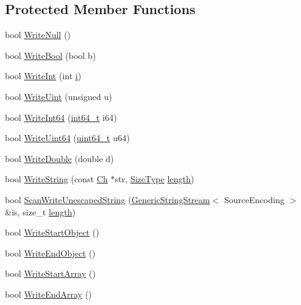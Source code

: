 \subsection*{Protected Member Functions}
\begin{DoxyCompactItemize}
\item 
bool \hyperlink{classWriter_a44862b3eba8d84b909c69aba875c9f4d}{Write\+Null} ()
\item 
bool \hyperlink{classWriter_a42ad68b6950431bb8ca0199568546eaf}{Write\+Bool} (bool b)
\item 
bool \hyperlink{classWriter_a31d0feda654ca245c41462be7dc59998}{Write\+Int} (int \hyperlink{game__play__state_8cpp_acb559820d9ca11295b4500f179ef6392}{i})
\item 
bool \hyperlink{classWriter_a2861227e93707d1478d2cf56644dca3b}{Write\+Uint} (unsigned u)
\item 
bool \hyperlink{classWriter_aa58d3f80c06394648de5055ecfb41587}{Write\+Int64} (\hyperlink{stdint_8h_a414156feea104f8f75b4ed9e3121b2f6}{int64\+\_\+t} i64)
\item 
bool \hyperlink{classWriter_ad07b325157220e3aa791c1c8c904021e}{Write\+Uint64} (\hyperlink{stdint_8h_aec6fcb673ff035718c238c8c9d544c47}{uint64\+\_\+t} u64)
\item 
bool \hyperlink{classWriter_ae7a0fc4740681d845d92c1213bd25aa1}{Write\+Double} (double d)
\item 
bool \hyperlink{classWriter_acda4412ef5f4cac6e89f9544e4b10f70}{Write\+String} (const \hyperlink{classWriter_ab08bff5fd2daec65f4a78779ca3d2139}{Ch} $\ast$str, \hyperlink{rapidjson_8h_a5ed6e6e67250fadbd041127e6386dcb5}{Size\+Type} \hyperlink{imgui__impl__opengl3__loader_8h_a011fc24f10426c01349e94a4edd4b0d5}{length})
\item 
bool \hyperlink{classWriter_a94140803bba7863a1b39c936bbe6d262}{Scan\+Write\+Unescaped\+String} (\hyperlink{structGenericStringStream}{Generic\+String\+Stream}$<$ Source\+Encoding $>$ \&is, size\+\_\+t \hyperlink{imgui__impl__opengl3__loader_8h_a011fc24f10426c01349e94a4edd4b0d5}{length})
\item 
bool \hyperlink{classWriter_a81c72a2eecd47e042f56ca93a27a5cb1}{Write\+Start\+Object} ()
\item 
bool \hyperlink{classWriter_a7e3f6760a50a72f4217a9b2d625c43ee}{Write\+End\+Object} ()
\item 
bool \hyperlink{classWriter_a3c3560a96cac58f98f4a74d6cb227204}{Write\+Start\+Array} ()
\item 
bool \hyperlink{classWriter_aabda2df1be6e83cef416e9b1f042e8f4}{Write\+End\+Array} ()

\end{DoxyCompactItemize}
